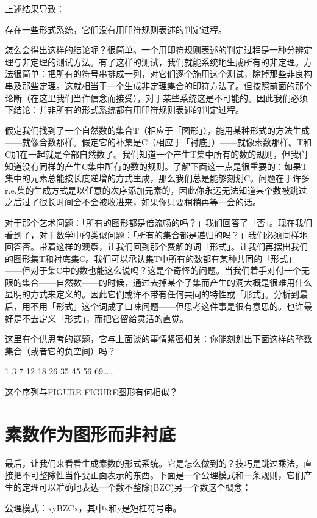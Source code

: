\documentclass[
  12pt,
  twoside,
  openright,
  oldfontcommands,
]{memoir}
\begin{document}
上述结果导致：

{存在一些形式系统，它们没有用印符规则表述的判定过程。}

怎么会得出这样的结论呢？很简单。一个用印符规则表述的判定过程是一种分辨定理与非定理的测试方法。有了这样的测试，我们就能系统地生成所有的非定理。方法很简单：把所有的符号串排成一列，对它们逐个施用这个测试，除掉那些非良构串及那些定理。这就相当于一个生成非定理集合的印符方法了。但按照前面的那个论断（在这里我们当作信念而接受），对于某些系统这是不可能的。因此我们必须下结论：并非所有的形式系统都有用印符规则表述的判定过程。

假定我们找到了一个自然数的集合T（相应于「图形」），能用某种形式的方法生成------就像合数那样。假定它的补集是C（相应于「衬底」）------就像素数那样。T和C加在一起就是全部自然数了。我们知道一个产生T集中所有的数的规则，但我们知道没有同样的产生C集中所有的数的规则。了解下面这一点是很重要的：如果T集中的元素总能按长度递增的方式生成，那么我们总是能够刻划C。问题在于许多r.e.集的生成方式是以任意的次序添加元素的，因此你永远无法知道某个数被跳过之后过了很长时间会不会被收进来，如果你只要稍稍再等一会的话。

对于那个艺术问题：「所有的图形都是倍流畅的吗？」我们回答了「否」。现在我们看到了，对于数学中的类似问题：「所有的集合都是递归的吗？」我们必须同样地回答否。带着这样的观察，让我们回到那个费解的词「形式」。让我们再摆出我们的图形集T和衬底集C。我们可以承认集T中所有的数都有某种共同的「形式」------但对于集C中的数也能这么说吗？这是个奇怪的问题。当我们着手对付一个无限的集合------自然数------的时候，通过去掉某个子集而产生的洞大概是很难用什么显明的方式来定义的。因此它们或许不带有任何共同的特性或「形式」。分析到最后，用不用「形式」这个词成了口味问题------但思考这件事是很有意思的。也许最好是不去定义「形式」，而把它留给灵活的直觉。

这里有个供思考的谜题，它与上面谈的事情紧密相关：你能刻划出下面这样的整数集合（或者它的负空间）吗？

1 3 7 12 18 26 35 45 56 69\ldots\ldots{}

这个序列与FIGURE-FIGURE图形有何相似？

\section{素数作为图形而非衬底}

最后，让我们来看看生成素数的形式系统。它是怎么做到的？技巧是跳过乘法，直接把不可整除性当作要正面表示的东西。下面是一个公理模式和一条规则，它们产生的定理可以准确地表达一个数不整除(BZC)另一个数这个概念：

公理模式：xyBZCx，其中x和y是短杠符号串。
\end{document}
